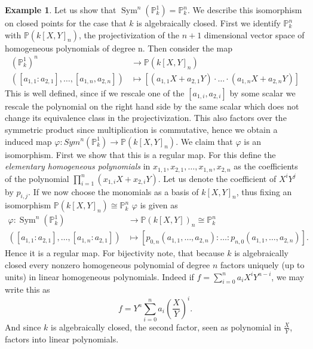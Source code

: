 \documentclass[11pt, a4paper, german, twoside]{article}
\theoremstyle{plain}
\theoremstyle{definition}
\newtheorem{example}[theorem]{Example}
\DeclareMathOperator{\Sym}{Sym}
\begin{document}
\begin{example}
    Let us show that $\Sym^n(\mathbb{P}_k^1) = \mathbb{P}_k^n$. 
    We describe this isomorphism on closed points for the case that $k$ is algebraically closed.
    First we identify $\mathbb{P}_k^n$ with $\mathbb{P}(k[X,Y]_n)$, the projectivization of the $n+1$ dimensional vector space of
    homogeneous polynomials of degree n. Then consider the map
    \begin{align*}
        (\mathbb{P}_k^1)^n &\to \mathbb{P}(k[X,Y]_n)\\
        ([a_{1,1}:a_{2,1}],\dots,[a_{1,n},a_{2,n}]) &\mapsto [(a_{1,1}X + a_{2,1}Y)\cdot \ldots \cdot(a_{1,n}X + a_{2,n}Y)]
    \end{align*}
    This is well defined, since if we rescale one of the $[a_{1,i},a_{2,i}]$ by some scalar we rescale the polynomial on the right hand side
    by the same scalar which does not change its equivalence class in the projectivization.
    This also factors over the symmetric product since multiplication is commutative, hence we obtain a induced map
    $\varphi \colon Sym^n(\mathbb{P}_k^1) \to \mathbb{P}(k[X,Y]_n)$. 
    We claim that $\varphi$ is an isomorphism. First we show that this is a regular map.
    For this define the \emph{elementary homogeneous polynomials} in $x_{1,1},x_{2,1},\dots,x_{1,n},x_{2,n}$ as the coefficients of the polynomial
    $\prod_{i=1}^n (x_{1,i}X+ x_{2,i}Y)$. Let us denote the coefficient of $X^iY^j$ by $p_{i,j}$.
    If we now choose the monomials as a basis of $k[X,Y]_n$, thus fixing an isomorphism $\mathbb{P}(k[X,Y]_n) \cong \mathbb{P}_k^n$
    $\varphi$ is given as
    \begin{align*}
        \varphi \colon \Sym^n(\mathbb{P}_k^1) &\to \mathbb{P}(k[X,Y])_n \cong \mathbb{P}_k^n\\
        ([a_{1,1}:a_{2,1}],\dots,[a_{1,n}:a_{2,1}]) &\mapsto [p_{0,n}(a_{1,1},\dots, a_{2,n}):\dots:p_{n,0}(a_{1,1},\dots, a_{2,n})].
    \end{align*}
    Hence it is a regular map.
    For bijectivity note, that because $k$ is algebraically closed every nonzero homogeneous polynomial of degree $n$ factors uniquely (up to
    units) in linear homogeneous polynomials.
    Indeed if $f = \sum_{i=0}^n a_iX^iY^{n-i}$, we may write this as
    \[
        f = Y^n \sum_{i=0}^n a_i\left(\frac{X}{Y}\right)^i.
    \]
    And since $k$ is algebraically closed, the second factor, seen as polynomial in $\frac{X}{Y}$, factors into linear polynomials.
\end{example}
\end{document}
